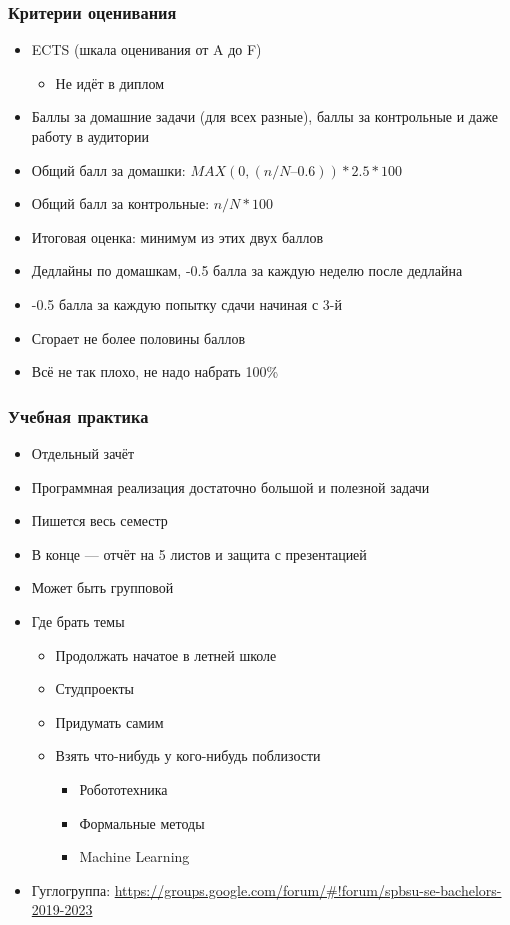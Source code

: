 \documentclass[xetex,mathserif,serif]{beamer}
\begin{document}
    \begin{frame}
        \frametitle{Критерии оценивания}
        \begin{itemize}
            \item ECTS (шкала оценивания от A до F)
            \begin{itemize}
                \item Не идёт в диплом
            \end{itemize}
            \item Баллы за домашние задачи (для всех разные), баллы за контрольные и даже работу в аудитории
            \item Общий балл за домашки: $MAX(0, (n/N – 0.6)) * 2.5 * 100$
            \item Общий балл за контрольные: $n/N * 100$
            \item Итоговая оценка: минимум из этих двух баллов
            \item Дедлайны по домашкам, -0.5 балла за каждую неделю после дедлайна
            \item -0.5 балла за каждую попытку сдачи начиная с 3-й
            \item Сгорает не более половины баллов
            \item Всё не так плохо, не надо набрать 100\%
        \end{itemize}
    \end{frame}

    \begin{frame}
        \frametitle{Учебная практика}
        \begin{itemize}
            \item Отдельный зачёт
            \item Программная реализация достаточно большой и полезной задачи
            \item Пишется весь семестр
            \item В конце --- отчёт на 5 листов и защита с презентацией
            \item Может быть групповой
            \item Где брать темы
            \begin{itemize}
                \item Продолжать начатое в летней школе
                \item Студпроекты
                \item Придумать самим
                \item Взять что-нибудь у кого-нибудь поблизости
                \begin{itemize}
                    \item Робототехника
                    \item Формальные методы
                    \item Machine Learning
                \end{itemize}
            \end{itemize}
            \item Гуглогруппа: \url{https://groups.google.com/forum/\#!forum/spbsu-se-bachelors-2019-2023}
        \end{itemize}
    \end{frame}
\end{document}
